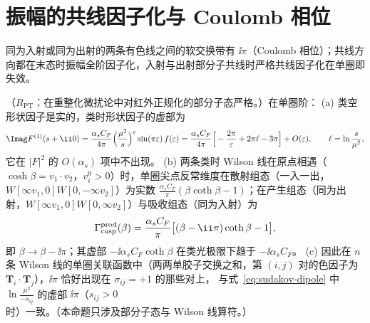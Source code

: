 \section{振幅的共线因子化与 Coulomb 相位}\label{sec:sudakov-collinear}

同为入射或同为出射的两条有色线之间的软交换带有 $\ii\pi$（Coulomb 相位）；共线方向都在末态时振幅全阶因子化，入射与出射部分子共线时严格共线因子化在单圈即失效。

\begin{proposition}\label{prop:sudakov-coulomb}
（$R_{\mathrm{PT}}$：在重整化微扰论中对红外正规化的部分子态严格。）在单圈阶：
(a) 类空形状因子是实的，类时形状因子的虚部为
\begin{equation}\label{eq:sudakov-coulomb-ff}
\Imag F^{(1)}(s+\ii0)=\frac{\alpha_sC_F}{4\pi}\Big(\frac{\mu^2}{s}\Big)^{\varepsilon}\sin(\pi\varepsilon)\,f(\varepsilon)
=\frac{\alpha_sC_F}{4\pi}\Big[-\frac{2\pi}{\varepsilon}+2\pi\ell-3\pi\Big]+O(\varepsilon),\qquad \ell=\ln\frac{s}{\mu^2},
\end{equation}
它在 $|F|^2$ 的 $O(\alpha_s)$ 项中不出现。
(b) 两条类时 Wilson 线在原点相遇（$\cosh\beta=v_1\cdot v_2$，$v_i^0>0$）时，单圈尖点反常维度在散射组态（一入一出，$W[\infty v_1,0]W[0,-\infty v_2]$）为实数
$\frac{\alpha_sC_F}\pi(\beta\coth\beta-1)$；在产生组态（同为出射，$W[\infty v_1,0]W[0,\infty v_2]$）与吸收组态（同为入射）为
\begin{equation}\label{eq:sudakov-coulomb-cusp}
\Gamma_{\rm cusp}^{\rm prod}(\beta)=\frac{\alpha_sC_F}{\pi}\big[(\beta-\ii\pi)\coth\beta-1\big],
\end{equation}
即 $\beta\to\beta-\ii\pi$；其虚部 $-\ii\alpha_sC_F\coth\beta$ 在类光极限下趋于 $-\ii\alpha_sC_F$。
(c) 因此在 $n$ 条 Wilson 线的单圈关联函数中（两两单胶子交换之和，第 $(i,j)$ 对的色因子为 $\mathbf T_i\cdot\mathbf T_j$），$\ii\pi$ 恰好出现在 $\sigma_{ij}=+1$ 的那些对上，
与式~\eqref{eq:sudakov-dipole} 中 $\ln\frac{\mu^2}{-s_{ij}}$ 的虚部 $\ii\pi$（$s_{ij}>0$ 时）一致。（本命题只涉及部分子态与 Wilson 线算符。）
\end{proposition}

